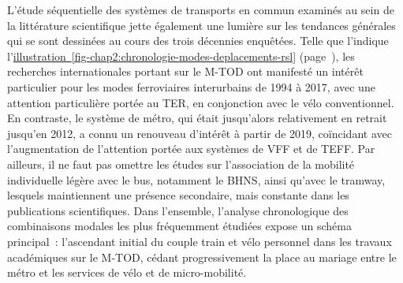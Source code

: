 \begin{refsegment}
L'étude séquentielle des systèmes de transports en commun examinés au sein de la littérature scientifique jette également une lumière sur les tendances générales qui se sont dessinées au cours des trois décennies enquêtées. Telle que l'indique l'\hyperref[fig-chap2:chronologie-modes-deplacements-rsl]{illustration~\ref{fig-chap2:chronologie-modes-deplacements-rsl}} (page~\pageref{fig-chap2:chronologie-modes-deplacements-rsl}), les recherches internationales portant sur le \acrshort{M-TOD} ont manifesté un intérêt particulier pour les modes ferroviaires interurbains de 1994 à 2017, avec une attention particulière portée au \acrfull{TER}, en conjonction avec le vélo conventionnel. En contraste, le système de métro, qui était jusqu'alors relativement en retrait jusqu'en 2012, a connu un renouveau d'intérêt à partir de 2019, coïncidant avec l'augmentation de l'attention portée aux systèmes de \acrshort{VFF} et de \acrshort{TEFF}. Par ailleurs, il ne faut pas omettre les études sur l'association de la mobilité individuelle légère avec le bus, notamment le \acrfull{BHNS}, ainsi qu'avec le tramway, lesquels maintiennent une présence secondaire, mais constante dans les publications scientifiques. Dans l'ensemble, l'analyse chronologique des combinaisons modales les plus fréquemment étudiées expose un schéma principal~: l'ascendant initial du couple train et vélo personnel dans les travaux académiques sur le \acrshort{M-TOD}, cédant progressivement la place au mariage entre le métro et les services de vélo et de micro-mobilité.%


\end{refsegment}

